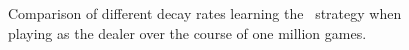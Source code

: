 \begin{figure}[h]
\caption{
	Comparison of different decay rates learning the \handmaxavg\ strategy
	when playing as the dealer
	over the course of one million games.
	}
\label{fig:expts-decay-comp}
\end{figure}
